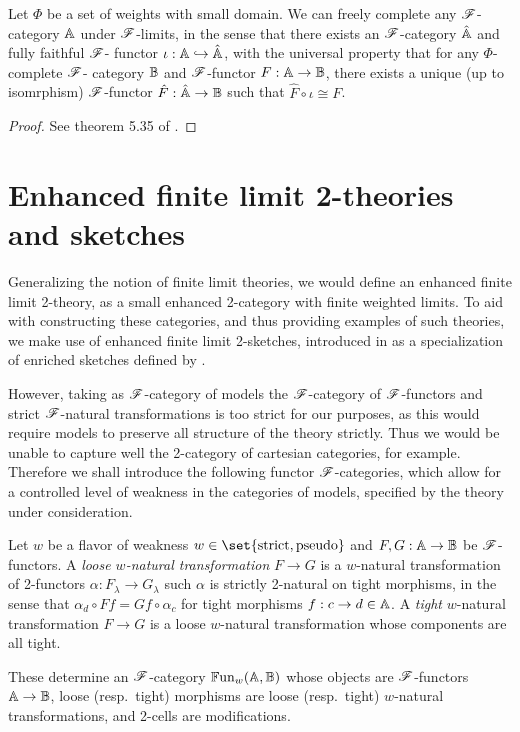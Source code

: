 \documentclass[../thesis.tex]{subfiles}
\begin{document}
\begin{theorem}\label{thm:free completion}
  Let $\Phi$ be a set of weights with small domain. We can freely complete any ${\mathscr{F}}$-category ${\mathbb{A}}$ under
  ${\mathscr{F}}$-limits, in the sense that there exists an ${\mathscr{F}}$-category $\hat{{\mathbb{A}}}$ and fully faithful ${\mathscr{F}}$-%
  functor $\iota : {\mathbb{A}} \hookrightarrow \hat {{\mathbb{A}}}$, with the universal property that for any $\Phi$-complete ${\mathscr{F}}$-%
  category ${\mathbb{B}}$ and ${\mathscr{F}}$-functor $F : {\mathbb{A}} \to {\mathbb{B}}$, there exists a unique (up to isomrphism) ${\mathscr{F}}$-functor
  $\hat F : \hat{{\mathbb{A}}} \to {\mathbb{B}}$ such that $\hat F \circ \iota \cong F$.
\end{theorem}
\begin{proof}
  See theorem 5.35 of \cite{kelly1982a}.
\end{proof}

\section{Enhanced finite limit 2-theories and sketches}
Generalizing the notion of finite limit theories, we would define an enhanced finite limit 2-theory,
as a small enhanced 2-category with finite weighted limits. To aid with constructing these categories,
and thus providing examples of such theories, we make use of enhanced finite limit 2-sketches, introduced
in \cite{arkor2024} as a specialization of enriched sketches defined by \cite{kelly1982a}. 

However, taking as ${\mathscr{F}}$-category of models the ${\mathscr{F}}$-category of ${\mathscr{F}}$-functors and strict ${\mathscr{F}}$-natural
transformations is too strict for our purposes, as this would require models to preserve all structure
of the theory strictly. Thus we would be unable to capture well the 2-category of cartesian categories,
for example. Therefore we shall introduce the following functor ${\mathscr{F}}$-categories, which allow for a
controlled level of weakness in the categories of models, specified by the theory under consideration.

\begin{definition}
  Let $w$ be a flavor of weakness $w \in \set{\text{strict},\text{pseudo}}$ and $F, G : {\mathbb{A}} \to {\mathbb{B}}$
  be ${\mathscr{F}}$-functors. A \emph{loose $w$-natural transformation} $F \to G$ is a $w$-natural transformation
  of 2-functors $\alpha : F_\lambda \to G_\lambda$ such $\alpha$ is strictly 2-natural on tight morphisms,
  in the sense that $\alpha_d \circ F f = G f \circ \alpha_c$ for tight morphisms $f : c \to d \in {\mathbb{A}}$. 
  A \emph{tight} $w$-natural transformation $F \to G$ is a loose $w$-natural transformation whose components
  are all tight.

  These determine an ${\mathscr{F}}$-category ${\mathbb{F}\mathrm{un}}_w({\mathbb{A}},{\mathbb{B}})$ whose objects are ${\mathscr{F}}$-functors ${\mathbb{A}} \to
  {\mathbb{B}}$, loose (resp.\ tight) morphisms are loose (resp.\ tight) $w$-natural transformations,
  and 2-cells are modifications. 
\end{definition}
\end{document}
